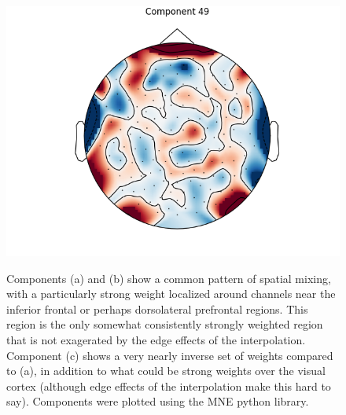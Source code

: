 \documentclass[fleqn,10pt]{wlscirep}
\begin{document}
\begin{figure}[h!]
\begin{minipage}{0.31\textwidth}
    \includegraphics[width=\linewidth]{max_act/49.png}
    \subcaption{}
    \label{fig:component_49}
  \end{minipage}
  \caption[textfind]{Components (a) and (b) show a common pattern of spatial mixing, with a particularly strong weight localized around channels near the inferior frontal or perhaps dorsolateral prefrontal regions. This region is the only somewhat consistently strongly weighted region that is not exagerated by the edge effects of the interpolation. Component (c) shows a very nearly inverse set of weights compared to (a), in addition to what could be strong weights over the visual cortex (although edge effects of the interpolation make this hard to say). Components were plotted using the MNE python library. \footnotemark} \label{fig:max_components}
\end{figure}

\end{document}
